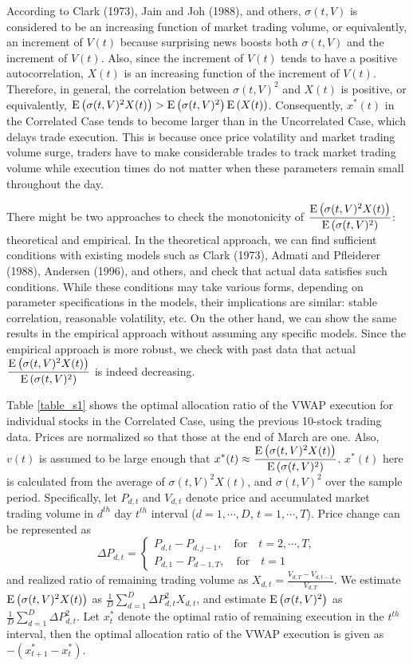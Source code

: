 According to Clark (1973), Jain and Joh (1988), and others, $\sigma(t,V)$ is considered to be an increasing function of market trading volume, or equivalently, an increment of $V(t)$ because surprising news boosts both $\sigma(t,V)$ and the increment of $V(t)$.  Also, since the increment of $V(t)$ tends to have a positive autocorrelation, $X(t)$ is an increasing function of the increment of $V(t)$.  Therefore, in general, the correlation between $\sigma(t,V)^2$ and $X(t)$ is positive, or equivalently, ${\mathrm{E}}\left( \sigma(t,V)^2X(t) \right)>{\mathrm{E}}\left( \sigma(t,V)^2 \right){\mathrm{E}}\left( X(t) \right)$.  Consequently, $x^*(t)$ in the Correlated Case tends to become larger than in the Uncorrelated Case, which delays trade execution.  This is because once price volatility and market trading volume surge, traders have to make considerable trades to track market trading volume while execution times do not matter when these parameters remain small throughout the day.

There might be two approaches to check the monotonicity of $\displaystyle \frac{{\mathrm{E}}\left( \sigma(t,V)^2X(t) \right)}{{\mathrm{E}}\left( \sigma(t,V)^2 \right)}$: theoretical and empirical.  In the theoretical approach, we can find sufficient conditions with existing models such as Clark (1973), Admati and Pfleiderer (1988), Andersen (1996), and others, and check that actual data satisfies such conditions.  While these conditions may take various forms, depending on parameter specifications in the models, their implications are similar: stable correlation, reasonable volatility, etc.  On the other hand, we can show the same results in the empirical approach without assuming any specific models.  Since the empirical approach is more robust, we check with past data that actual $\displaystyle \frac{{\mathrm{E}}\left( \sigma(t,V)^2X(t) \right)}{{\mathrm{E}}\left( \sigma(t,V)^2 \right)}$ is indeed decreasing.

Table \ref{table_s1} shows the optimal allocation ratio of the VWAP execution for individual stocks in the Correlated Case, using the previous 10-stock trading data.  Prices are normalized so that those at the end of March are one.  Also, $v(t)$ is assumed to be large enough that $\displaystyle x^*(t) \approx \frac{{\mathrm{E}}\left( \sigma(t,V)^2X(t) \right)}{{\mathrm{E}}\left( \sigma(t,V)^2 \right)}$.  $x^*(t)$ here is calculated from the average of $\sigma(t,V)^2X(t)$, and $\sigma(t,V)^2$ over the sample period.  Specifically, let $P_{d,t}$ and $V_{d,t}$ denote price and accumulated market trading volume in $d^{th}$ day $t^{th}$ interval ($d=1,\cdots,D$, $t=1,\cdots,T$).  Price change can be represented as 
\[
  \Delta P_{d,t} = \left\{
  \begin{array}{ll}
   P_{d,t}-P_{d,j-1}, \quad \mbox{for} \quad t=2,\cdots,T, \\
   P_{d,1}-P_{d-1,T}, \quad \mbox{for} \quad t=1
  \end{array}
  \right.
\]
and realized ratio of remaining trading volume as $\displaystyle X_{d,t}=\frac{V_{d,T}-V_{d,t-1}}{V_{d,T}}$.  We estimate ${\mathrm{E}}\left( \sigma(t,V)^2X(t) \right)$ as $\displaystyle \frac{1}{D} \sum_{d=1}^D \Delta P_{d,t}^2X_{d,t}$, and estimate ${\mathrm{E}}\left( \sigma(t,V)^2 \right)$ as $\displaystyle \frac{1}{D} \sum_{d=1}^D \Delta P_{d,t}^2$.  Let $x_t^*$ denote the optimal ratio of remaining execution in the $t^{th}$ interval, then the optimal allocation ratio of the VWAP execution is given as $-(x_{t+1}^*-x_t^*)$.

